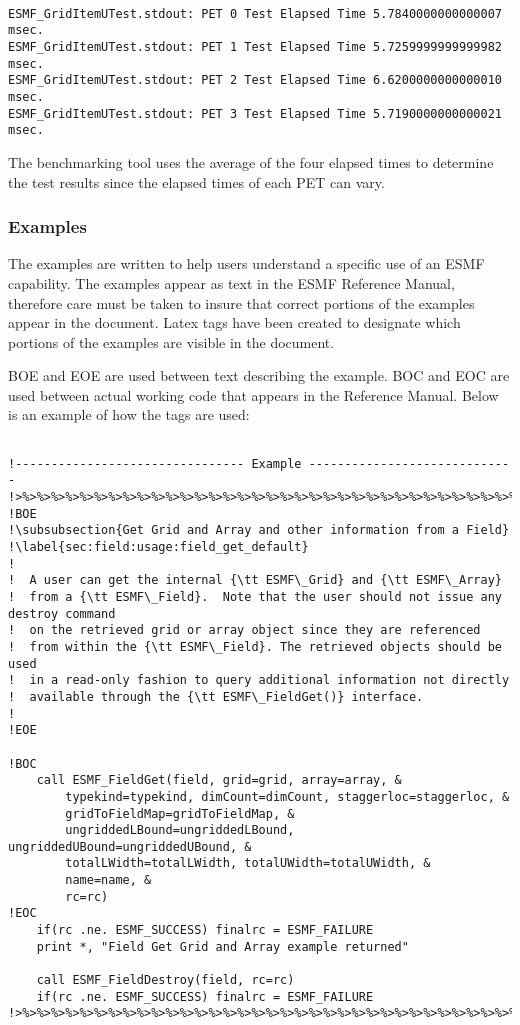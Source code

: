 \begin{verbatim}

ESMF_GridItemUTest.stdout: PET 0 Test Elapsed Time 5.7840000000000007 msec.
ESMF_GridItemUTest.stdout: PET 1 Test Elapsed Time 5.7259999999999982 msec.
ESMF_GridItemUTest.stdout: PET 2 Test Elapsed Time 6.6200000000000010 msec.
ESMF_GridItemUTest.stdout: PET 3 Test Elapsed Time 5.7190000000000021 msec.

\end{verbatim}


The benchmarking tool uses the average of the four elapsed times to determine the test results
since the elapsed times of each PET can vary.


\subsubsection{Examples}
The examples are written to help users understand a specific use of an
ESMF capability. The examples appear as text in the ESMF Reference Manual, therefore
care must be taken to insure that correct portions of the examples appear in the
document. Latex tags have been created to designate which portions of the
examples are visible in the document. 

BOE and EOE are used between text describing the example. BOC and EOC are used between
actual working code that appears in the Reference Manual. Below is an example of how
the tags are used:

\begin{verbatim}

!-------------------------------- Example -----------------------------
!>%>%>%>%>%>%>%>%>%>%>%>%>%>%>%>%>%>%>%>%>%>%>%>%>%>%>%>%>%>%>%>%>%>%>%
!BOE
!\subsubsection{Get Grid and Array and other information from a Field}
!\label{sec:field:usage:field_get_default}
!
!  A user can get the internal {\tt ESMF\_Grid} and {\tt ESMF\_Array}
!  from a {\tt ESMF\_Field}.  Note that the user should not issue any destroy command
!  on the retrieved grid or array object since they are referenced
!  from within the {\tt ESMF\_Field}. The retrieved objects should be used
!  in a read-only fashion to query additional information not directly
!  available through the {\tt ESMF\_FieldGet()} interface.
!
!EOE

!BOC
    call ESMF_FieldGet(field, grid=grid, array=array, &
        typekind=typekind, dimCount=dimCount, staggerloc=staggerloc, &
        gridToFieldMap=gridToFieldMap, &
        ungriddedLBound=ungriddedLBound, ungriddedUBound=ungriddedUBound, &
        totalLWidth=totalLWidth, totalUWidth=totalUWidth, &
        name=name, &
        rc=rc)
!EOC
    if(rc .ne. ESMF_SUCCESS) finalrc = ESMF_FAILURE
    print *, "Field Get Grid and Array example returned"

    call ESMF_FieldDestroy(field, rc=rc)
    if(rc .ne. ESMF_SUCCESS) finalrc = ESMF_FAILURE
!>%>%>%>%>%>%>%>%>%>%>%>%>%>%>%>%>%>%>%>%>%>%>%>%>%>%>%>%>%>%>%>%>%>%>%

\end{verbatim}

